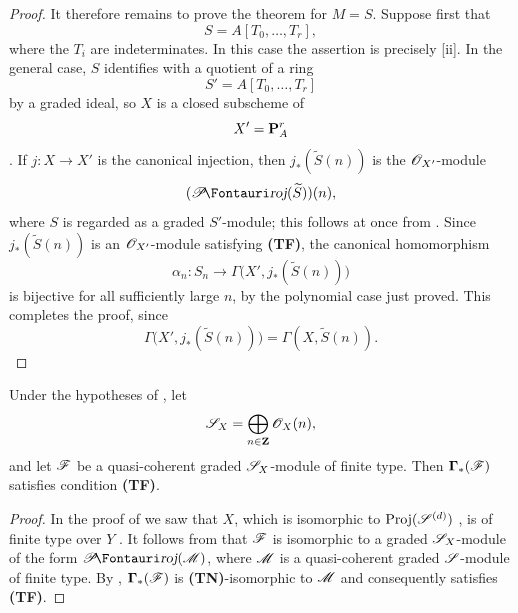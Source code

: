 \begin{proof}
It therefore remains to prove the theorem for $M=S$.
Suppose first that
\[
  S=A[T_0,\ldots,T_r],
\]
where the $T_i$ are indeterminates.
In this case the assertion is precisely [ii].
In the general case, $S$ identifies with a quotient of a ring
\[
  S'=A[T_0,\ldots,T_r]
\]
by a graded ideal, so $X$ is a closed subscheme of
\[
  X'=\mathbf{P}_A^r
\]
.
If $j:X\to X'$ is the canonical injection, then $j_*(\widetilde{S}(n))$ is the $\mathscr{O}_{X'}$-module
\[
  (\shProj(\widetilde{S}))(n),
\]
where $S$ is regarded as a graded $S'$-module; this follows at once from .
Since $j_*(\widetilde{S}(n))$ is an $\mathscr{O}_{X'}$-module satisfying \textbf{(TF)}, the canonical homomorphism
\[
  \alpha_n:S_n\longrightarrow
  \Gamma\bigl(X',j_*(\widetilde{S}(n))\bigr)
\]
is bijective for all sufficiently large $n$, by the polynomial case just proved.
This completes the proof, since
\[
  \Gamma\bigl(X',j_*(\widetilde{S}(n))\bigr)
  =\Gamma(X,\widetilde{S}(n)).
\]
\end{proof}

\begin{corollary}[2.3.2]
\label{III.2.3.2}
Under the hypotheses of , let
\[
  \mathscr{S}_X=\bigoplus_{n\in\mathbf{Z}}\mathscr{O}_X(n),
\]
and let $\mathscr{F}$ be a quasi-coherent graded $\mathscr{S}_X$-module of finite type.
Then $\boldsymbol{\Gamma}_*(\mathscr{F})$ satisfies condition \textbf{(TF)}.
\end{corollary}

\begin{proof}
In the proof of  we saw that $X$, which is isomorphic to $\operatorname{Proj}(\mathscr{S}^{(d)})$ , is of finite type over $Y$ .
It follows from  that $\mathscr{F}$ is isomorphic to a graded $\mathscr{S}_X$-module of the form $\shProj(\sh{M})$, where $\mathscr{M}$ is a quasi-coherent graded $\mathscr{S}$-module of finite type.
By , $\boldsymbol{\Gamma}_*(\mathscr{F})$ is \textbf{(TN)}-isomorphic to $\mathscr{M}$ and consequently satisfies \textbf{(TF)}.
\end{proof}

